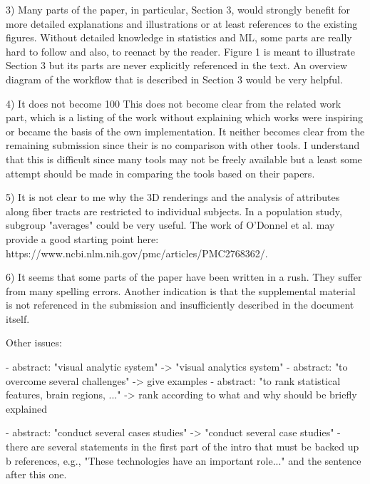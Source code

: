     3) Many parts of the paper, in particular, Section 3, would strongly benefit for
    more detailed explanations and illustrations or at least references to the
    existing figures. Without detailed knowledge in statistics and ML, some parts are
    really hard to follow and also, to reenact by the reader. Figure 1 is meant to
    illustrate Section 3 but its parts are never explicitly referenced in the text. An
    overview diagram of the workflow that is described in Section 3 would be very
    helpful.

    4) It does not become 100%
    This does not become clear from the related work part, which is a listing of the
    work without explaining which works were inspiring or became the basis of the own
    implementation. It neither becomes clear from the remaining submission since their
    is no comparison with other tools. I understand that this is difficult since many
    tools may not be freely available but a least some attempt should be made in
    comparing the tools based on their papers.

    5) It is not clear to me why the 3D renderings and the analysis of attributes
    along fiber tracts are restricted to individual subjects. In a population study,
    subgroup "averages" could be very useful. The work of O'Donnel et al. may provide
    a good starting point here: https://www.ncbi.nlm.nih.gov/pmc/articles/PMC2768362/.

    6) It seems that some parts of the paper have been written in a rush. They suffer
    from many spelling errors. Another indication is that the supplemental material is
    not referenced in the submission and insufficiently described in the document
    itself.

    Other issues:

    - abstract: "visual analytic system" -> "visual analytics system"  
    - abstract: "to overcome several challenges" -> give examples
    - abstract: "to rank statistical features, brain regions, ..." -> rank according
    to what and why should be briefly explained
    
    - abstract: "conduct several cases studies" -> "conduct several case studies" 
    - there are several statements in the first part of the intro that must be backed
    up b references, e.g., "These technologies have an important role..." and the
    sentence after this one.
   
